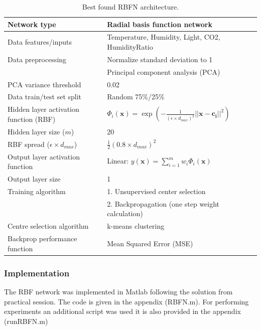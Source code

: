 \documentclass[a4paper, 11pt]{article}
\begin{document}
\begin{table}[h!]
\centering
\begin{tabular}{|l l|} 
 \hline
 Network type & Radial basis function network  \\ 
 \hline
 Data features/inputs & Temperature, Humidity, Light, CO2, HumidityRatio\\
 Data preprocessing & Normalize standard deviation to 1 \\
 & Principal component analysis (PCA) \\
 PCA variance threshold & 0.02 \\ 
 Data train/test set split & Random 75\%/25\% \\
 \hline
 Hidden layer activation function (RBF) & $
\Phi_i(\boldsymbol{x}) = \exp\left(-\frac{1}{(\epsilon \times d_{max})^2} \lvert\lvert \boldsymbol{x} -  \boldsymbol{c_i} \rvert\rvert ^2\right)  
$  \\
 Hidden layer size ($m$) & 20  \\
 RBF spread ($\epsilon \times d_{max}$)& $\frac{1}{2}(0.8 \times d_{max})^2$   \\
 \hline
 Output layer activation function & Linear: $y(\boldsymbol{x}) = \displaystyle\sum_{i=1}^{m} w_i \Phi_i(\boldsymbol{x})$ \\
 Output layer size & 1 \\
 \hline
 Training algorithm & 1. Unsupervised center selection \\ 
 & 2. Backpropagation (one step weight calculation)  \\
 Centre selection algorithm & k-means clustering \\
 Backprop performance function & Mean Squared Error (MSE)  \\ [1ex] 
 \hline
\end{tabular}
\caption{Best found RBFN architecture.}
\label{table:architecture}
\end{table}

\subsubsection*{Implementation}
The RBF network was implemented in Matlab following the solution from practical session. The code is given in the appendix (RBFN.m). For performing experiments an additional script was used it is also provided in the appendix (runRBFN.m)
\end{document}
